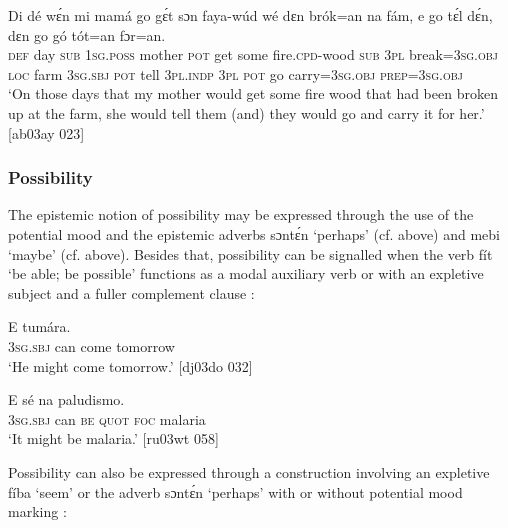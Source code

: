 \ea%
    \label{ex:key:448}
    \gll Di  dé  wɛ́n    mi    mamá  go  gɛ́t  sɔn    faya-wúd    wé
dɛn  brók=an    na  fám,    e    go  tɛ́l  dɛ́n,    dɛn  go  gó
tót=an    fɔr=an.\\
\textsc{def}  day  \textsc{sub}    \textsc{1sg.poss}  mother  \textsc{pot}  get  some  fire.\textsc{cpd}{}-wood    \textsc{sub}
\textsc{3pl}  break=\textsc{3sg.obj}  \textsc{loc}  farm  \textsc{3sg.sbj}  \textsc{pot}  tell  \textsc{3pl.indp}  \textsc{3pl}  \textsc{pot}  go
carry=\textsc{3sg.obj}  \textsc{prep=3sg.obj}\\

\glt ‘On those days that my mother would get some fire wood that had been 
broken up at the farm, she would tell them (and) they would go and carry 
it for her.’ [ab03ay 023]
\z

\subsubsection{Possibility}\label{sec:6.7.4.2}

The epistemic notion of possibility may be expressed through the use of the potential mood and the epistemic adverbs sɔntɛ́n ‘perhaps’ (cf.  above) and mebi ‘maybe’ (cf.  above). Besides that, possibility can be signalled when the verb fít ‘be able; be possible’ functions as a modal auxiliary verb  or with an expletive subject and a fuller complement clause {\fff}: {\fff}


\ea%
    \label{ex:key:449}
    \gll E          tumára.\\
\textsc{3sg.sbj}  can  come  tomorrow\\

\glt ‘He might come tomorrow.’ [dj03do 032]
\z


\ea%
    \label{ex:key:450}
    \gll E      sé    na  paludismo.\\
\textsc{3sg.sbj}  can  \textsc{be}  \textsc{quot}    \textsc{foc}  malaria\\

\glt ‘It might be malaria.’ [ru03wt 058]
\z

Possibility can also be expressed through a construction involving an expletive fíba ‘seem’  or the adverb sɔntɛ́n ‘perhaps’ with or without potential mood marking :


